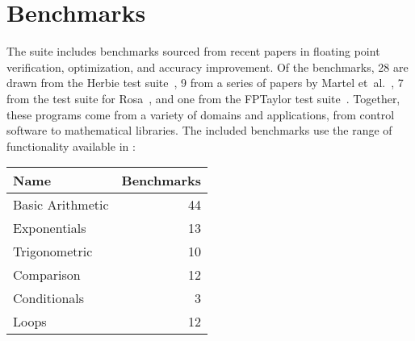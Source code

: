 \documentclass[main.tex]{subfiles}
\begin{document}
\section{Benchmarks}
\label{sec:benchmarks}

The \name suite includes \nbenches benchmarks
  sourced from recent papers in floating point verification,
  optimization, and accuracy improvement.
Of the benchmarks,
  28 are drawn from the Herbie test suite~\cite{pavel15},
  9 from a series of papers by Martel et~al.~\cite{fmics15},
  7 from the test suite for Rosa~\cite{DarulovaK14},
  and one from the FPTaylor test suite~\cite{fptaylor-fm15}.
Together, these programs come from
  a variety of domains and applications,
  from control software to mathematical libraries.
The included benchmarks use the range of functionality
  available in \name:

\begin{tabular}{lr}
Name & Benchmarks \\\hline
Basic Arithmetic & 44 \\
Exponentials & 13 \\
Trigonometric & 10 \\
Comparison & 12 \\
Conditionals & 3 \\
Loops & 12
\end{tabular}
\end{document}

